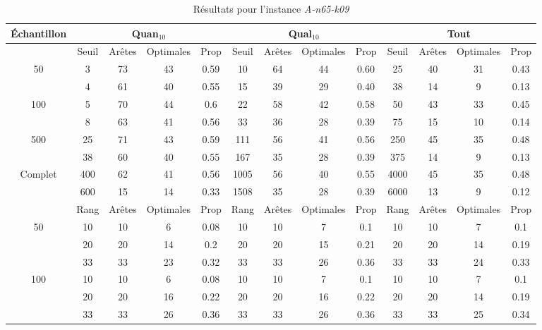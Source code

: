 \documentclass[a4paper,11pt]{article}%
\begin{document}
\begin{table}[p]
\caption{Résultats pour l'instance \emph{A-n65-k09}}
\label{T2}
\begin{center}
\begin{tabular}{|@{}c@{}|@{}c@{}|@{}c@{}|@{}c@{}|@{}c@{}||@{}c@{}|@{}c@{}|@{}c@{}|@{}c@{}||@{}c@{}|@{}c@{}|@{}c@{}|@{}c@{}|}

\hline
 Échantillon & \multicolumn{4}{c|}{Quan$_{10}$} & \multicolumn{4}{c|}{Qual$_{10}$} & \multicolumn{4}{c|}{Tout} \\
 \hline
 & Seuil & Arêtes & Optimales & Prop & Seuil & Arêtes & Optimales & Prop & Seuil & Arêtes & Optimales & Prop \\
 \hline
 50 & 3 & 73 & 43 & 0.59 & 10 & 64 & 44 & 0.60 & 25 & 40 & 31 & 0.43 \\
 \cline{2-13} 
    & 4 & 61 & 40 & 0.55 & 15 & 39 & 29 & 0.40 & 38 & 14 & 9 & 0.13 \\
  \hline
   100 & 5 & 70 & 44 & 0.6 & 22 & 58 & 42 & 0.58 & 50 & 43 & 33 & 0.45 \\
 \cline{2-13} 
    & 8 & 63 & 41 & 0.56 & 33 & 36 & 28 & 0.39 & 75 & 15 & 10 & 0.14 \\
  \hline
   500 & 25 & 71 & 43 & 0.59 & 111 & 56 & 41 & 0.56 & 250 & 45 & 35 & 0.48 \\
 \cline{2-13} 
    & 38 & 60 & 40 & 0.55 & 167 & 35 & 28 & 0.39 & 375 & 14 & 9 & 0.13 \\
  \hline
   Complet & 400 & 62 & 41 & 0.56 & 1005 & 56 & 40 & 0.55 & 4000 & 45 & 35 & 0.48 \\
 \cline{2-13} 
    & 600 & 15 & 14 & 0.33 & 1508 & 35 & 28 & 0.39 & 6000 & 13 & 9 & 0.12 \\
  \hline
 & Rang& Arêtes & Optimales & Prop & Rang& Arêtes & Optimales & Prop & Rang& Arêtes & Optimales & Prop \\
 \hline
 50 & 10 &10 & 6 & 0.08 & 10&10  & 7 & 0.1 & 10& 10 & 7 & 0.1  \\
 \cline{2-13} 
    & 20&20 & 14 & 0.2 & 20&20  & 15 & 0.21 & 20&20  & 14 & 0.19  \\
 \cline{2-13} 
    & 33&33 & 23 & 0.32 & 33&33 & 26 & 0.36 & 33&33 & 24 & 0.33  \\
  \hline
   100 & 10& 10 & 6 & 0.08 & 10& 10 & 7 & 0.1 & 10& 10 & 7 & 0.1  \\
 \cline{2-13} 
    & 20& 20& 16 & 0.22 & 20&20 & 16 & 0.22 & 20& 20& 14 & 0.19  \\
  \cline{2-13} 
    & 33&33 & 26 & 0.36 & 33&33 & 26 & 0.36 & 33&33 & 25 & 0.34  \\

\end{tabular}
\end{center}
\end{table}
\end{document}
